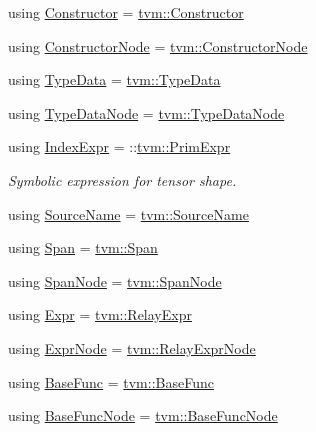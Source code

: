 \begin{DoxyCompactItemize}
\item 
using \hyperlink{namespacetvm_1_1relay_aec85bf097deda59bd22e88475c9165e9}{Constructor} = \hyperlink{classtvm_1_1Constructor}{tvm\+::\+Constructor}
\item 
using \hyperlink{namespacetvm_1_1relay_a6b95f70a9b44cc1c96593201594d1345}{Constructor\+Node} = \hyperlink{classtvm_1_1ConstructorNode}{tvm\+::\+Constructor\+Node}
\item 
using \hyperlink{namespacetvm_1_1relay_a6e725a1cb4c83346e261eac7dc7292a8}{Type\+Data} = \hyperlink{classtvm_1_1TypeData}{tvm\+::\+Type\+Data}
\item 
using \hyperlink{namespacetvm_1_1relay_a2b8c0d5920eaca88569907e92df6066f}{Type\+Data\+Node} = \hyperlink{classtvm_1_1TypeDataNode}{tvm\+::\+Type\+Data\+Node}
\item 
using \hyperlink{namespacetvm_1_1relay_ae153a27d81399fd266b8d598227764c4}{Index\+Expr} = \+::\hyperlink{classtvm_1_1PrimExpr}{tvm\+::\+Prim\+Expr}
\begin{DoxyCompactList}\small\item\em Symbolic expression for tensor shape. \end{DoxyCompactList}\item 
using \hyperlink{namespacetvm_1_1relay_a14eacafcb803b0757e48654bb1bac655}{Source\+Name} = \hyperlink{classtvm_1_1SourceName}{tvm\+::\+Source\+Name}
\item 
using \hyperlink{namespacetvm_1_1relay_af40ca6124bc2e88f2323eeb79d326cc0}{Span} = \hyperlink{classtvm_1_1Span}{tvm\+::\+Span}
\item 
using \hyperlink{namespacetvm_1_1relay_a7d0fa6578e97d0d64b08865f94f04827}{Span\+Node} = \hyperlink{classtvm_1_1SpanNode}{tvm\+::\+Span\+Node}
\item 
using \hyperlink{namespacetvm_1_1relay_a5b84e3790f89bb3fad5c7911eeb99531}{Expr} = \hyperlink{classtvm_1_1RelayExpr}{tvm\+::\+Relay\+Expr}
\item 
using \hyperlink{namespacetvm_1_1relay_a387f18e050d016c52ea6c4781e7cff6c}{Expr\+Node} = \hyperlink{classtvm_1_1RelayExprNode}{tvm\+::\+Relay\+Expr\+Node}
\item 
using \hyperlink{namespacetvm_1_1relay_acbaff2ae7feec23fea55e025a9cc1b76}{Base\+Func} = \hyperlink{classtvm_1_1BaseFunc}{tvm\+::\+Base\+Func}
\item 
using \hyperlink{namespacetvm_1_1relay_a4edf28d1226abc08d28bc2fd90ce7b42}{Base\+Func\+Node} = \hyperlink{classtvm_1_1BaseFuncNode}{tvm\+::\+Base\+Func\+Node}

\end{DoxyCompactItemize}
